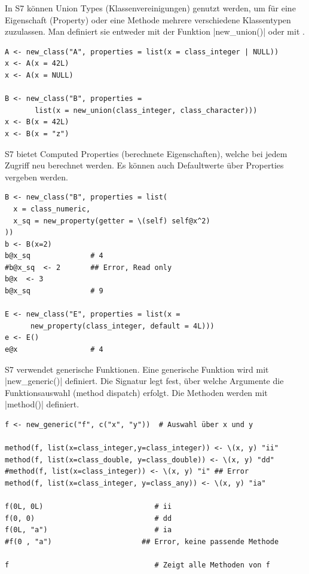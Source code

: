 \documentclass[10pt,twocolumn]{scrartcl}
\renewcommand{\lstinline}{\mycoloredinline}
\begin{document}
In S7 können Union Types (Klassenvereinigungen) genutzt werden, um für eine Eigenschaft (Property) oder eine Methode mehrere verschiedene Klassentypen zuzulassen. Man definiert sie entweder mit der Funktion \lstinline|new_union()| oder mit \lstinline{|}.

\begin{lstlisting}
A <- new_class("A", properties = list(x = class_integer | NULL))
x <- A(x = 42L)
x <- A(x = NULL)

B <- new_class("B", properties =
       list(x = new_union(class_integer, class_character)))
x <- B(x = 42L)
x <- B(x = "z")
\end{lstlisting}

S7 bietet Computed Properties (berechnete Eigenschaften), welche bei jedem Zugriff neu berechnet werden. Es können auch Defaultwerte über Properties vergeben werden.

\begin{lstlisting}
B <- new_class("B", properties = list(
  x = class_numeric,
  x_sq = new_property(getter = \(self) self@x^2) 
))
b <- B(x=2)
b@x_sq              # 4
#b@x_sq  <- 2       ## Error, Read only
b@x  <- 3
b@x_sq              # 9

E <- new_class("E", properties = list(x =
      new_property(class_integer, default = 4L)))
e <- E()
e@x                 # 4
\end{lstlisting}

S7 verwendet generische Funktionen. Eine generische Funktion wird mit \lstinline|new_generic()| definiert. Die Signatur legt fest, über welche Argumente die Funktionsauswahl (method dispatch) erfolgt. Die Methoden werden mit \lstinline|method()| definiert.

\begin{lstlisting}
f <- new_generic("f", c("x", "y"))  # Auswahl über x und y

method(f, list(x=class_integer,y=class_integer)) <- \(x, y) "ii"
method(f, list(x=class_double, y=class_double)) <- \(x, y) "dd"
#method(f, list(x=class_integer)) <- \(x, y) "i" ## Error
method(f, list(x=class_integer, y=class_any)) <- \(x, y) "ia"

f(0L, 0L)                          # ii
f(0, 0)                            # dd
f(0L, "a")                         # ia
#f(0 , "a")                     ## Error, keine passende Methode

f                                  # Zeigt alle Methoden von f
\end{lstlisting}
\end{document}
